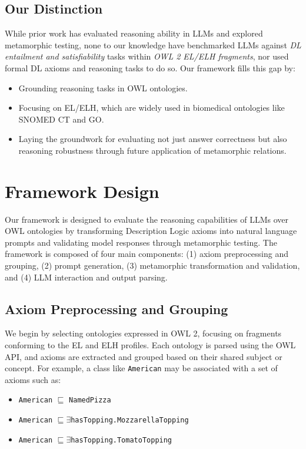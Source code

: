 \documentclass[11pt]{article}
\begin{document}
\subsection{Our Distinction}
While prior work has evaluated reasoning ability in LLMs and explored metamorphic testing, none to our knowledge have benchmarked LLMs against \textit{DL entailment and satisfiability} tasks within \textit{OWL 2 EL/ELH fragments}, nor used formal DL axioms and reasoning tasks to do so. Our framework fills this gap by:
\begin{itemize}
    \item Grounding reasoning tasks in OWL ontologies.
    \item Focusing on EL/ELH, which are widely used in biomedical ontologies like SNOMED CT and GO.
    \item Laying the groundwork for evaluating not just answer correctness but also reasoning robustness through future application of metamorphic relations.
\end{itemize}

\section{Framework Design}

Our framework is designed to evaluate the reasoning capabilities of LLMs over OWL ontologies by transforming Description Logic axioms into natural language prompts and validating model responses through metamorphic testing. The framework is composed of four main components: (1) axiom preprocessing and grouping, (2) prompt generation, (3) metamorphic transformation and validation, and (4) LLM interaction and output parsing.

\subsection{Axiom Preprocessing and Grouping}
We begin by selecting ontologies expressed in OWL 2, focusing on fragments conforming to the EL and ELH profiles. Each ontology is parsed using the OWL API, and axioms are extracted and grouped based on their shared subject or concept. For example, a class like \texttt{American} may be associated with a set of axioms such as:

\begin{itemize}
    \item \texttt{American} $\sqsubseteq$ \texttt{NamedPizza}
    \item \texttt{American} $\sqsubseteq \exists$\texttt{hasTopping.MozzarellaTopping}
    \item \texttt{American} $\sqsubseteq \exists$\texttt{hasTopping.TomatoTopping}
\end{itemize}
\end{document}
